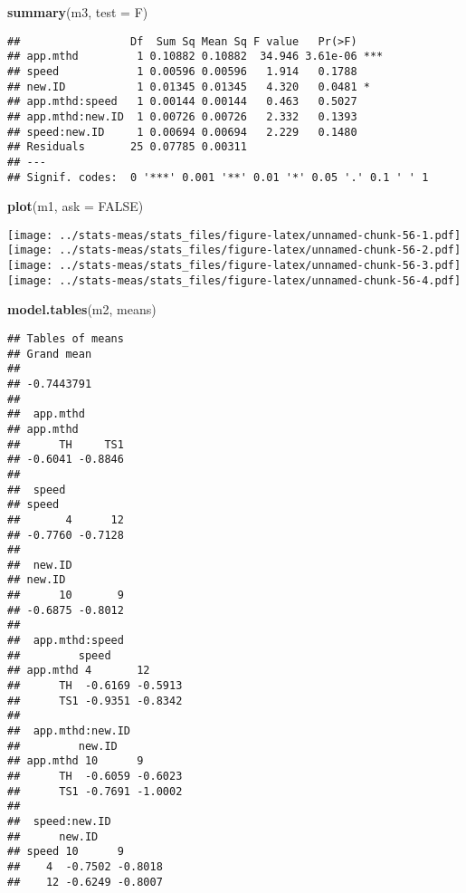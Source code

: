 \documentclass[
]{article}
\newenvironment{Shaded}{\begin{snugshade}}{\end{snugshade}}
\newcommand{\AttributeTok}[1]{\textcolor[rgb]{0.13,0.29,0.53}{#1}}
\newcommand{\ConstantTok}[1]{\textcolor[rgb]{0.56,0.35,0.01}{#1}}
\newcommand{\FunctionTok}[1]{\textcolor[rgb]{0.13,0.29,0.53}{\textbf{#1}}}
\newcommand{\NormalTok}[1]{#1}
\newcommand{\StringTok}[1]{\textcolor[rgb]{0.31,0.60,0.02}{#1}}
\begin{document}
\begin{Shaded}
\begin{Highlighting}[]
\FunctionTok{summary}\NormalTok{(m3, }\AttributeTok{test =} \StringTok{\textquotesingle{}F\textquotesingle{}}\NormalTok{)}
\end{Highlighting}
\end{Shaded}

\begin{verbatim}
##                 Df  Sum Sq Mean Sq F value   Pr(>F)    
## app.mthd         1 0.10882 0.10882  34.946 3.61e-06 ***
## speed            1 0.00596 0.00596   1.914   0.1788    
## new.ID           1 0.01345 0.01345   4.320   0.0481 *  
## app.mthd:speed   1 0.00144 0.00144   0.463   0.5027    
## app.mthd:new.ID  1 0.00726 0.00726   2.332   0.1393    
## speed:new.ID     1 0.00694 0.00694   2.229   0.1480    
## Residuals       25 0.07785 0.00311                     
## ---
## Signif. codes:  0 '***' 0.001 '**' 0.01 '*' 0.05 '.' 0.1 ' ' 1
\end{verbatim}

\begin{Shaded}
\begin{Highlighting}[]
\FunctionTok{plot}\NormalTok{(m1, }\AttributeTok{ask =} \ConstantTok{FALSE}\NormalTok{)}
\end{Highlighting}
\end{Shaded}

\texttt{[image: ../stats-meas/stats\_files/figure-latex/unnamed-chunk-56-1.pdf]}
\texttt{[image: ../stats-meas/stats\_files/figure-latex/unnamed-chunk-56-2.pdf]}
\texttt{[image: ../stats-meas/stats\_files/figure-latex/unnamed-chunk-56-3.pdf]}
\texttt{[image: ../stats-meas/stats\_files/figure-latex/unnamed-chunk-56-4.pdf]}

\begin{Shaded}
\begin{Highlighting}[]
\FunctionTok{model.tables}\NormalTok{(m2, }\StringTok{\textquotesingle{}means\textquotesingle{}}\NormalTok{)}
\end{Highlighting}
\end{Shaded}

\begin{verbatim}
## Tables of means
## Grand mean
##            
## -0.7443791 
## 
##  app.mthd 
## app.mthd
##      TH     TS1 
## -0.6041 -0.8846 
## 
##  speed 
## speed
##       4      12 
## -0.7760 -0.7128 
## 
##  new.ID 
## new.ID
##      10       9 
## -0.6875 -0.8012 
## 
##  app.mthd:speed 
##         speed
## app.mthd 4       12     
##      TH  -0.6169 -0.5913
##      TS1 -0.9351 -0.8342
## 
##  app.mthd:new.ID 
##         new.ID
## app.mthd 10      9      
##      TH  -0.6059 -0.6023
##      TS1 -0.7691 -1.0002
## 
##  speed:new.ID 
##      new.ID
## speed 10      9      
##    4  -0.7502 -0.8018
##    12 -0.6249 -0.8007
\end{verbatim}
\end{document}
